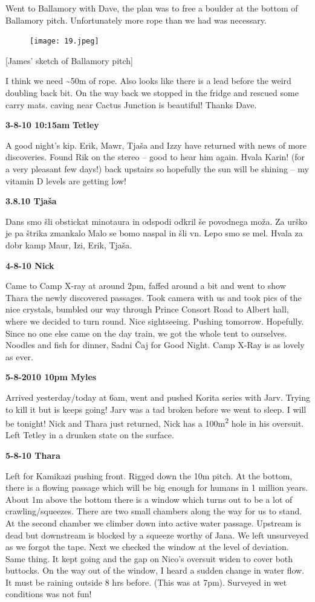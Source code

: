 Went to Ballamory with Dave, the plan was to free a boulder at the
bottom of Ballamory pitch. Unfortunately more rope than we had was
necessary.

\begin{figure}[htbp]
\centering
\texttt{[image: 19.jpeg]}
\caption{}
\end{figure}

{[}James' sketch of Ballamory pitch{]}

I think we need \textasciitilde{}50m of rope. Also looks like there is a
lead before the weird doubling back bit. On the way back we stopped in
the fridge and rescued some carry mats. caving near Cactus Junction is
beautiful! Thanks Dave.

\textbf{3-8-10 10:15am} \textbf{Tetley}

A good night's kip. Erik, Mawr, Tjaša and Izzy have returned with news
of more discoveries. Found Rik on the stereo -- good to hear him again.
Hvala Karin! (for a very pleasant few days!) back upstairs so hopefully
the sun will be shining -- my vitamin D levels are getting low!

\textbf{3.8.10 Tjaša}

Dans smo šli obstickat minotaura in odspodi odkril še povodnega moža. Za
urško je pa štrika zmankalo Malo se bomo naspal in šli vn. Lepo smo se
mel. Hvala za dobr kamp Maur, Izi, Erik, Tjaša.

\textbf{4-8-10 Nick}

Came to Camp X-ray at around 2pm, faffed around a bit and went to show
Thara the newly discovered passages. Took camera with us and took pics
of the nice crystals, bumbled our way through Prince Consort Road to
Albert hall, where we decided to turn round. Nice sightseeing. Pushing
tomorrow. Hopefully. Since no one else came on the day train, we got the
whole tent to ourselves. Noodles and fish for dinner, Sadni Čaj for Good
Night. Camp X-Ray is as lovely as ever.

\textbf{5-8-2010 10pm Myles}

Arrived yesterday/today at 6am, went and pushed Korita series with Jarv.
Trying to kill it but is keeps going! Jarv was a tad broken before we
went to sleep. I will be tonight! Nick and Thara just returned, Nick has
a 100m\textsuperscript{2} hole in his oversuit. Left Tetley in a drunken
state on the surface.

\textbf{5-8-10 Thara}

Left for Kamikazi pushing front. Rigged down the 10m pitch. At the
bottom, there is a flowing passage which will be big enough for humans
in 1 million years. About 1m above the bottom there is a window which
turns out to be a lot of crawling/squeezes. There are two small chambers
along the way for us to stand. At the second chamber we climber down
into active water passage. Upstream is dead but downstream is blocked by
a squeeze worthy of Jana. We left unsurveyed as we forgot the tape. Next
we checked the window at the level of deviation. Same thing. It kept
going and the gap on Nico's oversuit widen to cover both buttocks. On
the way out of the window, I heard a sudden change in water flow. It
must be raining outside 8 hrs before. (This was at 7pm). Surveyed in wet
conditions was not fun!

